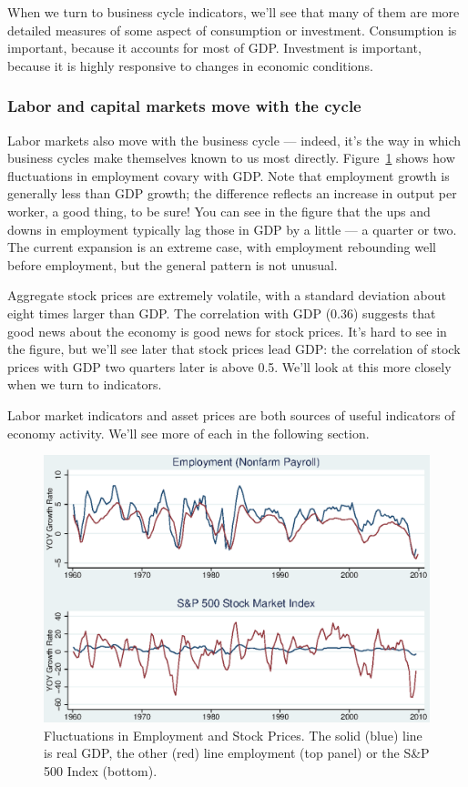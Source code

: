 \documentclass[letterpaper,12pt]{article}
\begin{document}
When we turn to business cycle indicators, we'll see that
many of them are more detailed measures of
some aspect of consumption or investment.
Consumption is important, because it accounts for most of GDP.
Investment is important, because it is highly responsive
to changes in economic conditions.


\subsubsection*{Labor and capital markets move with the cycle}


Labor markets also move with the business cycle ---
indeed, it's the way in which business cycles make themselves 
known to us most directly.  
Figure~\ref{fig:gother} shows how fluctuations in employment
covary with GDP.  
Note that employment growth is generally less than GDP growth;
the difference reflects an increase in output per worker,
a good thing, to be sure!
You can see in the figure that the ups and downs in employment 
typically lag those in GDP by a little --- a quarter or two.  
The current expansion is an extreme case, with 
employment rebounding well before employment, 
but the general pattern is not unusual.  


Aggregate stock prices are extremely volatile, with a standard deviation
about eight times larger than GDP.
The correlation with GDP (0.36) suggests that
good news about the economy is good news for stock prices.
It's hard to see in the figure, 
but we'll see later that stock prices lead GDP:
the correlation of stock prices with GDP two quarters later is above 0.5.
We'll look at this more closely when we turn to indicators.

Labor market indicators and asset prices are
both sources of useful indicators of economy activity.
We'll see more of each in the following section.

%
\begin{figure}
    \centering
    \includegraphics[scale=0.8]{usgother.eps}
    \caption{Fluctuations in Employment and Stock Prices.
    The solid (blue) line is real GDP, the other (red) line
    employment (top panel) or the S\&P 500 Index (bottom).}
    \label{fig:gother}%
\end{figure}
\end{document}
